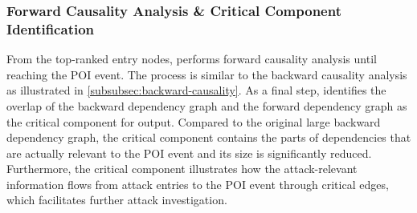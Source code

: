 \subsubsection{Forward Causality Analysis \& Critical Component Identification}
\label{subsubsec:forward-causality}
From the top-ranked entry nodes, \tool performs forward causality analysis until reaching the POI event. 
The process is similar to the backward causality analysis as illustrated in \cref{subsubsec:backward-causality}. 
%
As a final step, \tool identifies the overlap of the backward dependency graph and the forward dependency graph as the critical component for output.
%
Compared to the original large backward dependency graph, the critical component contains the parts of dependencies that are actually relevant to the POI event and its size is significantly reduced.
%
Furthermore, the critical component illustrates how the attack-relevant information flows from attack entries to the POI event through critical edges, which facilitates further attack investigation.